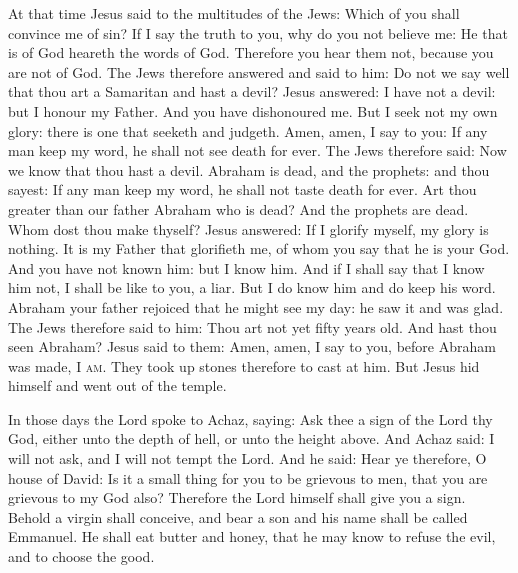 \begin{multicols}{2}

At that time Jesus said to the multitudes of the Jews:
Which of you shall convince me of sin? If I say the truth to you, why do you
not believe me: He that is of God heareth the words of God. Therefore you hear
them not, because you are not of God.  The Jews therefore answered and said to
him: Do not we say well that thou art a Samaritan and hast a devil?  Jesus
answered: I have not a devil: but I honour my Father. And you have dishonoured
me.  But I seek not my own glory: there is one that seeketh and judgeth.  Amen,
amen, I say to you: If any man keep my word, he shall not see death for ever.
The Jews therefore said: Now we know that thou hast a devil.  Abraham is dead,
and the prophets: and thou sayest: If any man keep my word, he shall not taste
death for ever.  Art thou greater than our father Abraham who is dead? And the
prophets are dead. Whom dost thou make thyself?  Jesus answered: If I glorify
myself, my glory is nothing.  It is my Father that glorifieth me, of whom you
say that he is your God.  And you have not known him: but I know him. And if I
shall say that I know him not, I shall be like to you, a liar. But I do know
him and do keep his word.  Abraham your father rejoiced that he might see my
day: he saw it and was glad.  The Jews therefore said to him: Thou art not yet
fifty years old.  And hast thou seen Abraham?  Jesus said to them: Amen, amen,
I say to you, before Abraham was made, \textsc{I am}.  They took up stones
therefore to cast at him. But Jesus hid himself and went out of the temple.


\bigskip




In those days the Lord spoke to Achaz, saying:
Ask thee a sign of the Lord thy God, either unto the depth of
hell, or unto the height above.
And Achaz said: I will not ask, and I will not tempt the Lord.
And he said: Hear ye therefore, O house of David: Is it a small
thing for you to be grievous to men, that you are grievous to my God
also?
Therefore the Lord himself shall give you a sign. Behold a virgin
shall conceive, and bear a son and his name shall be called Emmanuel.
He shall eat butter and honey, that he may know to refuse the
evil, and to choose the good.





\end{multicols}
